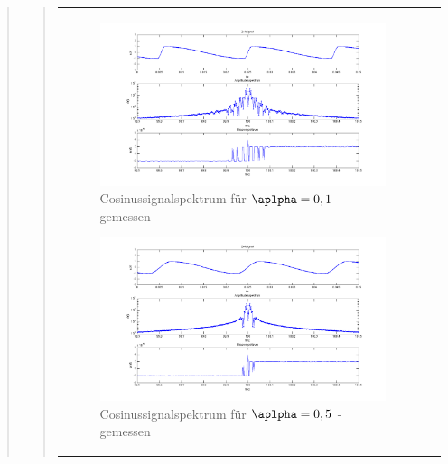 \begin{quote}
\begin{quote}
\begin{center}
\begin{tabular}{ll}
\begin{minipage}{0.6\textwidth}
                
                \end{minipage}

                \begin{minipage}{0.6\textwidth}

                    \begin{figure}[H]
                        \label{fig:}            
                        \includegraphics[scale=0.3]{./Bilder/cos_alpha1_-_gemessen.png} %
                        \caption{Cosinussignalspektrum für $\aplpha = 0,1$ - gemessen}
                    \end{figure}                
                    
                    \begin{figure}[H]
                        \label{fig:}            
                        \includegraphics[scale=0.3]{./Bilder/cos_alpha5_-_gemessen.png} %
                        \caption{Cosinussignalspektrum für $\aplpha = 0,5$ - gemessen}
                    \end{figure}                


\end{minipage}
\end{tabular}
\end{center}
\end{quote}
\end{quote}
